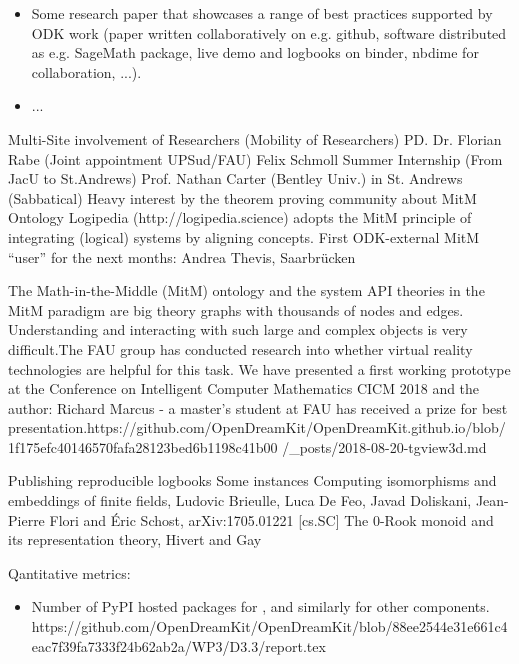 \begin{Aim 1}
\begin{Aim 2}
\begin{itemize}
 
\item Some research paper that showcases a range of best practices supported by ODK work (paper written collaboratively on e.g. github,
  software distributed as e.g. SageMath package, live demo and logbooks on binder, nbdime for collaboration, ...).\item ...\end{itemize}

Multi-Site involvement of Researchers (Mobility of Researchers)
PD. Dr. Florian Rabe (Joint appointment UPSud/FAU)
Felix Schmoll Summer Internship (From JacU to St.Andrews)
Prof. Nathan Carter (Bentley Univ.) in St. Andrews (Sabbatical)
Heavy interest by the theorem proving community about MitM Ontology
Logipedia (http://logipedia.science) adopts the MitM principle of integrating (logical) systems by aligning concepts.
First ODK-external MitM “user” for the next months: Andrea Thevis, Saarbrücken 


The Math-in-the-Middle (MitM) ontology and the system API theories in the MitM paradigm are big theory graphs with thousands of 
nodes and edges. Understanding and interacting with such large and complex objects is very difficult.The FAU group has conducted
research into whether virtual reality technologies are helpful for this task. We have presented a first working prototype at the
Conference on Intelligent Computer Mathematics CICM 2018 and the author: Richard Marcus - a master's student at FAU has received a
prize for best presentation.https://github.com/OpenDreamKit/OpenDreamKit.github.io/blob/1f175efc40146570fafa28123bed6b1198c41b00
/_posts/2018-08-20-tgview3d.md


Publishing reproducible logbooks %
    Some instances
    Computing isomorphisms and embeddings of finite fields, Ludovic Brieulle, Luca De Feo, Javad Doliskani, Jean-Pierre Flori and Éric 
    Schost, arXiv:1705.01221 [cs.SC] 
    The 0-Rook monoid and its representation theory, Hivert and Gay
     

Qantitative metrics:
    \begin{itemize}
    \item Number of PyPI hosted packages for \Sage, and similarly for other components.
     https://github.com/OpenDreamKit/OpenDreamKit/blob/88ee2544e31e661c4eac7f39fa7333f24b62ab2a/WP3/D3.3/report.tex
  

\end{itemize}
\end{Aim 2}
\end{Aim 1}
